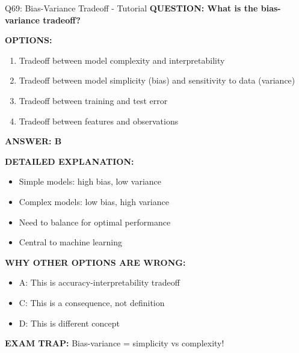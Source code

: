 \documentclass[8pt]{beamer}
\begin{document}
	\begin{frame}{Q69: Bias-Variance Tradeoff - Tutorial}
		\fontsize{6.5}{7.5}\selectfont
		\textbf{QUESTION: What is the bias-variance tradeoff?}
		
		\vspace{0.1cm}
		\textbf{OPTIONS:}
		\begin{enumerate}
			\item Tradeoff between model complexity and interpretability
			\item Tradeoff between model simplicity (bias) and sensitivity to data (variance)
			\item Tradeoff between training and test error
			\item Tradeoff between features and observations
		\end{enumerate}
		
		\vspace{0.1cm}
		\textcolor{myblue}{\textbf{ANSWER: B}}
		
		\vspace{0.1cm}
		\textbf{DETAILED EXPLANATION:}
		\begin{itemize}
			\item Simple models: high bias, low variance
			\item Complex models: low bias, high variance
			\item Need to balance for optimal performance
			\item Central to machine learning
		\end{itemize}
		
		\vspace{0.1cm}
		\textcolor{myred}{\textbf{WHY OTHER OPTIONS ARE WRONG:}}
		\begin{itemize}
			\item \textcolor{myred}{A:} This is accuracy-interpretability tradeoff
			\item \textcolor{myred}{C:} This is a consequence, not definition
			\item \textcolor{myred}{D:} This is different concept
		\end{itemize}
		
		\textcolor{myred}{\textbf{EXAM TRAP:}} Bias-variance = \textcolor{myblue}{simplicity vs complexity}!
	\end{frame}
	
\end{document}
